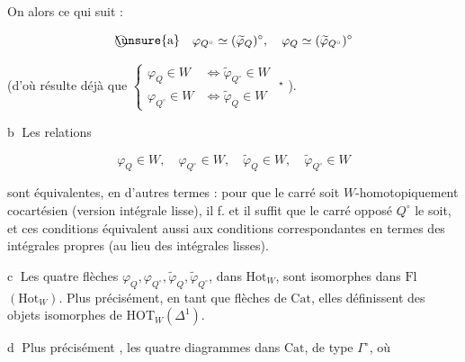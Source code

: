 On  alors ce qui suit :

\[
\text{\textcircled{\unsure{a}}}\quad \varphi_{Q^\circ}\simeq(\widetilde\varphi_Q)^\circ,\quad \varphi_Q\simeq(\widetilde\varphi_{Q^\circ})^\circ
\]

(d'où résulte déjà que $\left\{\begin{aligned}\varphi_Q\in W&\Longleftrightarrow\widetilde\varphi_{Q^\circ}\in W\\\varphi_{Q^\circ}\in W&\Longleftrightarrow\widetilde\varphi_Q\in W\end{aligned}\right.$ \unsure{\deleted{)}} ${}^{\star}$
).

\textcircled{b} Les relations

\[
\varphi_Q\in W,\quad \varphi_{Q^\circ}\in W,\quad \widetilde\varphi_Q\in W,\quad \widetilde\varphi_{Q^\circ}\in W
\]

sont équivalentes, en d'autres termes : pour que le carré soit $W$-homotopiquement cocartésien (version intégrale lisse), il f. et il suffit que le carré opposé $Q^\circ$ le soit, et ces conditions équivalent aussi aux conditions correspondantes en termes des intégrales propres (au lieu des intégrales lisses).

\textcircled{c} Les quatre flèches $\varphi_Q,\varphi_{Q^\circ},\widetilde\varphi_Q,\widetilde\varphi_{Q^\circ}$,  dans $\mathrm{Hot}_W$, sont isomorphes dans \uline{$\mathrm{Fl}$}$(\mathrm{Hot}_W)$. Plus précisément, en tant que flèches de $\mathrm{Cat}$,
elles définissent des objets isomorphes de $\mathrm{HOT}_W(\Delta^1)$.

\textcircled{d} Plus précisément , les quatre diagrammes dans $\mathrm{Cat}$, de type $\Gamma^\circ$, où


